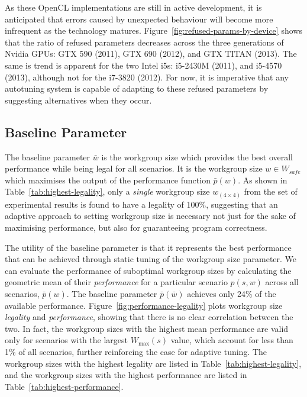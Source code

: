 As these OpenCL implementations are still in active development, it is
anticipated that errors caused by unexpected behaviour will become
more infrequent as the technology
matures. Figure~\ref{fig:refused-params-by-device} shows that the
ratio of refused parameters decreases across the three generations of
Nvidia GPUs: GTX 590 (2011), GTX 690 (2012), and GTX TITAN (2013). The
same is trend is apparent for the two Intel i5s: i5-2430M (2011), and
i5-4570 (2013), although not for the i7-3820 (2012). For now, it is
imperative that any autotuning system is capable of adapting to these
refused parameters by suggesting alternatives when they occur.


\subsection{Baseline Parameter}\label{subsec:baseline}

The baseline parameter $\bar{w}$ is the workgroup size which provides
the best overall performance while being legal for all scenarios. It
is the workgroup size $w \in W_{safe}$ which maximises the output of
the performance function $\bar{p}(w)$. As shown in
Table~\ref{tab:highest-legality}, only a \emph{single} workgroup size
$w_{(4 \times 4)}$ from the set of experimental results is found to
have a legality of 100\%, suggesting that an adaptive approach to
setting workgroup size is necessary not just for the sake of
maximising performance, but also for guaranteeing program correctness.

The utility of the baseline parameter is that it represents the best
performance that can be achieved through static tuning of the
workgroup size parameter. We can evaluate the performance of
suboptimal workgroup sizes by calculating the geometric mean of their
\emph{performance} for a particular scenario $p(s, w)$ across all
scenarios, $\bar{p}(w)$. The baseline parameter $\bar{p}(\bar{w})$
achieves only 24\% of the available
performance. Figure~\ref{fig:performance-legality} plots workgroup
size \emph{legality} and \emph{performance}, showing that there is no
clear correlation between the two. In fact, the workgroup sizes with
the highest mean performance are valid only for scenarios with the
largest $W_{\max}(s)$ value, which account for less than 1\% of all
scenarios, further reinforcing the case for adaptive tuning. The
workgroup sizes with the highest legality are listed in
Table~\ref{tab:highest-legality}, and the workgroup sizes with the
highest performance are listed in Table~\ref{tab:highest-performance}.

